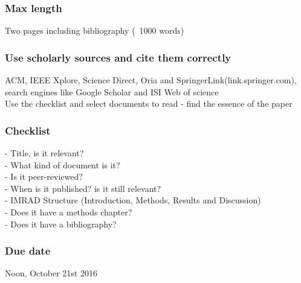 \documentclass[10pt,a4paper]{article}
\begin{document}
\subsubsection*{Max length}
Two pages including bibliography (~1000 words)
\subsubsection*{Use scholarly sources and cite them correctly}
ACM, IEEE Xplore, Science Direct, Oria and SpringerLink(link.springer.com), search engines like Google Scholar and ISI Web of science\\
Use the checklist and select documents to read - find the essence of the paper
\subsubsection*{Checklist}
- Title, is it relevant? \\
- What kind of document is it? \\
- Is it peer-reviewed? \\
- When is it published? is it still relevant?\\
- IMRAD Structure (Introduction, Methods, Results and Discussion)\\
- Does it have a methods chapter?\\
- Does it have a bibliography? \\
\subsubsection*{Due date}
Noon, October 21st 2016
\end{document}
